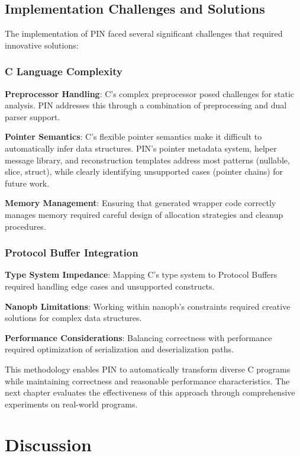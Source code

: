 \documentclass[doublespace,nopageskip]{VTthesis} %
\begin{document}
	\section{Implementation Challenges and Solutions} \label{se:implementation_challenges}
	
	The implementation of PIN faced several significant challenges that required innovative solutions:
	
	\subsection{C Language Complexity}
	
	\textbf{Preprocessor Handling}: C's complex preprocessor posed challenges for static analysis. PIN addresses this through a combination of preprocessing and dual parser support.
	
\textbf{Pointer Semantics}: C's flexible pointer semantics make it difficult to automatically infer data structures. PIN's pointer metadata system, helper message library, and reconstruction templates address most patterns (nullable, slice, struct), while clearly identifying unsupported cases (pointer chains) for future work.
	
	\textbf{Memory Management}: Ensuring that generated wrapper code correctly manages memory required careful design of allocation strategies and cleanup procedures.
	
	\subsection{Protocol Buffer Integration}
	
	\textbf{Type System Impedance}: Mapping C's type system to Protocol Buffers required handling edge cases and unsupported constructs.
	
	\textbf{Nanopb Limitations}: Working within nanopb's constraints required creative solutions for complex data structures.
	
	\textbf{Performance Considerations}: Balancing correctness with performance required optimization of serialization and deserialization paths.
	
	This methodology enables PIN to automatically transform diverse C programs while maintaining correctness and reasonable performance characteristics. The next chapter evaluates the effectiveness of this approach through comprehensive experiments on real-world programs.
\chapter{Discussion} \label{ch:discussion}
\end{document}
